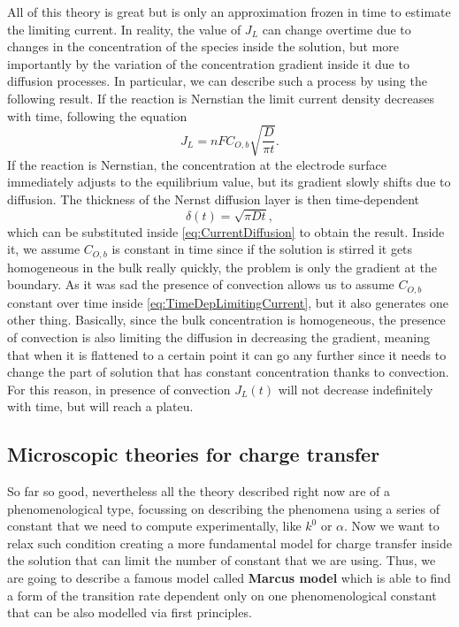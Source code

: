 All of this theory is great but is only an approximation frozen in time to estimate the limiting current. In reality, the value of $J_L$ can change overtime due to changes in the concentration of the species inside the solution, but more importantly by the variation of the concentration gradient inside it due to diffusion processes. In particular, we can describe such a process by using the following result.
{
    If the reaction is Nernstian the limit current density decreases with time, following the equation
    \begin{equation}
        \label{eq:TimeDepLimitingCurrent}
        J_L = nFC_{O,b}\sqrt{\frac{D}{\pi t}}.
    \end{equation}
}
{
    If the reaction is Nernstian, the concentration at the electrode surface immediately adjusts to the equilibrium value, but its gradient slowly shifts due to diffusion. The thickness of the Nernst diffusion layer is then time-dependent
    \begin{equation}
        \delta(t) = \sqrt{\pi Dt},
    \end{equation}
    which can be substituted inside \eqref{eq:CurrentDiffusion} to obtain the result. Inside it, we assume $C_{O,b}$ is constant in time since if the solution is stirred it gets homogeneous in the bulk really quickly, the problem is only the gradient at the boundary.
}
\nt
{
    As it was sad the presence of convection allows us to assume $C_{O,b}$ constant over time inside \eqref{eq:TimeDepLimitingCurrent}, but it also generates one other thing. Basically, since the bulk concentration is homogeneous, the presence of convection is also limiting the diffusion in decreasing the gradient, meaning that when it is flattened to a certain point it can go any further since it needs to change the part of solution that has constant concentration thanks to convection. For this reason, in presence of convection $J_L(t)$ will not decrease indefinitely with time, but will reach a plateu.
}

\subsection{Microscopic theories for charge transfer}

So far so good, nevertheless all the theory described right now are of a phenomenological type, focussing on describing the phenomena using a series of constant that we need to compute experimentally, like $k^0$ or $\alpha$. Now we want to relax such condition creating a more fundamental model for charge transfer inside the solution that can limit the number of constant that we are using. Thus, we are going to describe a famous model called \textbf{Marcus model} which is able to find a form of the transition rate dependent only on one phenomenological constant that can be also modelled via first principles.

